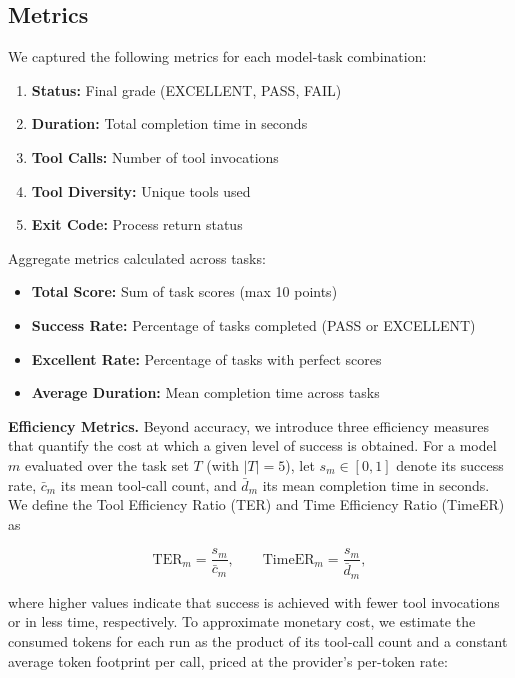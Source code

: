 \subsection{Metrics}
\label{sec:metrics}

We captured the following metrics for each model-task combination:

\begin{enumerate}
    \item \textbf{Status:} Final grade (EXCELLENT, PASS, FAIL)
    \item \textbf{Duration:} Total completion time in seconds
    \item \textbf{Tool Calls:} Number of tool invocations
    \item \textbf{Tool Diversity:} Unique tools used
    \item \textbf{Exit Code:} Process return status
\end{enumerate}

Aggregate metrics calculated across tasks:
\begin{itemize}
    \item \textbf{Total Score:} Sum of task scores (max 10 points)
    \item \textbf{Success Rate:} Percentage of tasks completed (PASS or EXCELLENT)
    \item \textbf{Excellent Rate:} Percentage of tasks with perfect scores
    \item \textbf{Average Duration:} Mean completion time across tasks
\end{itemize}

\noindent\textbf{Efficiency Metrics.} Beyond accuracy, we introduce three efficiency measures that quantify the cost at which a given level of success is obtained. For a model $m$ evaluated over the task set $T$ (with $|T|=5$), let $s_m \in [0,1]$ denote its success rate, $\bar{c}_m$ its mean tool-call count, and $\bar{d}_m$ its mean completion time in seconds. We define the Tool Efficiency Ratio (TER) and Time Efficiency Ratio (TimeER) as

\begin{equation}
\mathrm{TER}_m = \frac{s_m}{\bar{c}_m}, \qquad
\mathrm{TimeER}_m = \frac{s_m}{\bar{d}_m},
\label{eq:efficiency}
\end{equation}

\noindent where higher values indicate that success is achieved with fewer tool invocations or in less time, respectively. To approximate monetary cost, we estimate the consumed tokens for each run as the product of its tool-call count and a constant average token footprint per call, priced at the provider's per-token rate:

